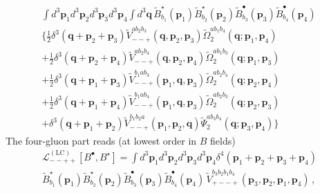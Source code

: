 \documentclass[english,american]{article}
\begin{document}
\begin{multline}
\int d^{3}\mathbf{p}_{1}d^{3}\mathbf{p}_{2}d^{3}\mathbf{p}_{3}d^{3}\mathbf{p}_{4}\int d^{3}\mathbf{q}\,\tilde{B}_{b_{1}}^{\star}\left(\mathbf{p}_{1}\right)\tilde{B}_{b_{2}}^{\star}\left(\mathbf{p}_{2}\right)\tilde{B}_{b_{3}}^{\bullet}\left(\mathbf{p}_{3}\right)\tilde{B}_{b_{4}}^{\bullet}\left(\mathbf{p}_{4}\right)\,\\
\Bigg\{\frac{1}{2}\delta^{3}\left(\mathbf{q}+\mathbf{p}_{2}+\mathbf{p}_{3}\right)\tilde{V}_{--+}^{ab_{2}b_{3}}\left(\mathbf{q},\mathbf{p}_{2},\mathbf{p}_{3}\right)\tilde{\Omega}_{2}^{ab_{1}b_{4}}\left(\mathbf{q};\mathbf{p}_{1},\mathbf{p}_{4}\right)\\
+\frac{1}{2}\delta^{3}\left(\mathbf{q}+\mathbf{p}_{2}+\mathbf{p}_{4}\right)\tilde{V}_{--+}^{ab_{2}b_{4}}\left(\mathbf{q},\mathbf{p}_{2},\mathbf{p}_{4}\right)\tilde{\Omega}_{2}^{ab_{1}b_{3}}\left(\mathbf{q};\mathbf{p}_{1},\mathbf{p}_{3}\right)\\
+\frac{1}{2}\delta^{3}\left(\mathbf{q}+\mathbf{p}_{1}+\mathbf{p}_{3}\right)\tilde{V}_{--+}^{b_{1}ab_{3}}\left(\mathbf{p}_{1},\mathbf{q},\mathbf{p}_{3}\right)\tilde{\Omega}_{2}^{ab_{2}b_{4}}\left(\mathbf{q};\mathbf{p}_{2},\mathbf{p}_{4}\right)\\
+\frac{1}{2}\delta^{3}\left(\mathbf{q}+\mathbf{p}_{1}+\mathbf{p}_{4}\right)\tilde{V}_{--+}^{b_{1}ab_{4}}\left(\mathbf{p}_{1},\mathbf{q},\mathbf{p}_{3}\right)\tilde{\Omega}_{2}^{ab_{2}b_{3}}\left(\mathbf{q};\mathbf{p}_{2},\mathbf{p}_{3}\right)\\
+\delta^{3}\left(\mathbf{q}+\mathbf{p}_{1}+\mathbf{p}_{2}\right)\tilde{V}_{--+}^{b_{1}b_{2}a}\left(\mathbf{p}_{1},\mathbf{p}_{2},\mathbf{q}\right)\tilde{\Psi}_{2}^{ab_{3}b_{4}}\left(\mathbf{q};\mathbf{p}_{3},\mathbf{p}_{4}\right)\Bigg\}\label{eq:MHV_4_1}
\end{multline}
The four-gluon part reads (at lowest order in $B$ fields)
\begin{multline}
\mathcal{L}_{--++}^{\left(\mathrm{LC}\right)}\left[B^{\bullet},B^{\star}\right]=\int d^{3}\mathbf{p}_{1}d^{3}\mathbf{p}_{2}d^{3}\mathbf{p}_{3}d^{3}\mathbf{p}_{4}\delta^{4}\left(\mathbf{p}_{1}+\mathbf{p}_{2}+\mathbf{p}_{3}+\mathbf{p}_{4}\right)\\
\tilde{B}_{b_{1}}^{\star}\left(\mathbf{p}_{1}\right)\tilde{B}_{b_{2}}^{\star}\left(\mathbf{p}_{2}\right)\tilde{B}_{b_{3}}^{\bullet}\left(\mathbf{p}_{3}\right)\tilde{B}_{b_{4}}^{\bullet}\left(\mathbf{p}_{4}\right)\,\tilde{V}_{+--+}^{b_{3}b_{2}b_{1}b_{4}}\left(\mathbf{p}_{3},\mathbf{p}_{2},\mathbf{p}_{1},\mathbf{p}_{4}\right)\,,
\end{multline}
\end{document}
